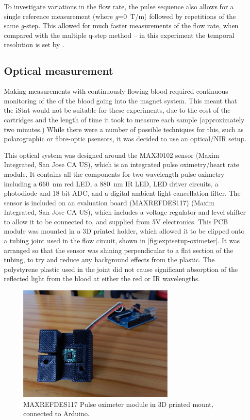 To investigate variations in the flow rate, the pulse sequence also allows for a single reference measurement (where \textit{g}=\SI{0}{T/m}) followed by repetitions of the same \textit{g}-step.
This allowed for much faster measurements of the flow rate, when compared with the multiple q-step method -- in this experiment the temporal resolution is set by \TR.

\subsection{Optical \SOtwo measurement}
\label{sec:exptsetup-pulseoximeter}
Making measurements with continuously flowing blood required continuous monitoring of the \SOtwo of the blood going into the magnet system.
This meant that the iStat would not be suitable for these experiments, due to the cost of the cartridges and the length of time it took to measure each sample (approximately two minutes.)
While there were a number of possible techniques for this, such as polarographic or fibre-optic p\Otwo sensors, it was decided to use an optical/NIR setup.

This optical system was designed around the MAX30102 sensor (Maxim Integrated, San Jose CA US), which is an integrated pulse oximetry/heart rate module.
It contains all the components for two wavelength pulse oximetry including a \SI{660}{nm} red LED, a \SI{880}{nm} IR LED, LED driver circuits, a photodiode and 18-bit ADC, and a digital ambient light cancellation filter.
The sensor is included on an evaluation board (MAXREFDES117) (Maxim Integrated, San Jose CA US), which includes a voltage regulator and level shifter to allow it to be connected to, and supplied from 5V electronics.
This PCB module was mounted in a 3D printed holder, which allowed it to be clipped onto a tubing joint used in the flow circuit, shown in \autoref{fig:exptsetup-oximeter}.
It was arranged so that the sensor was shining perpendicular to a flat section of the tubing, to try and reduce any background effects from the plastic.
The polystyrene plastic used in the joint did not cause significant absorption of the reflected light from the blood at either the red or IR wavelengths.

\begin{figure}
\centering
\includegraphics[width=0.7\textwidth]{figures/exptsetup/opticalsensor.JPG}
\caption[Optical \SOtwo sensor]{MAXREFDES117 Pulse oximeter module in 3D printed mount, connected to Arduino.}
\label{fig:exptsetup-oximeter}
\end{figure}


